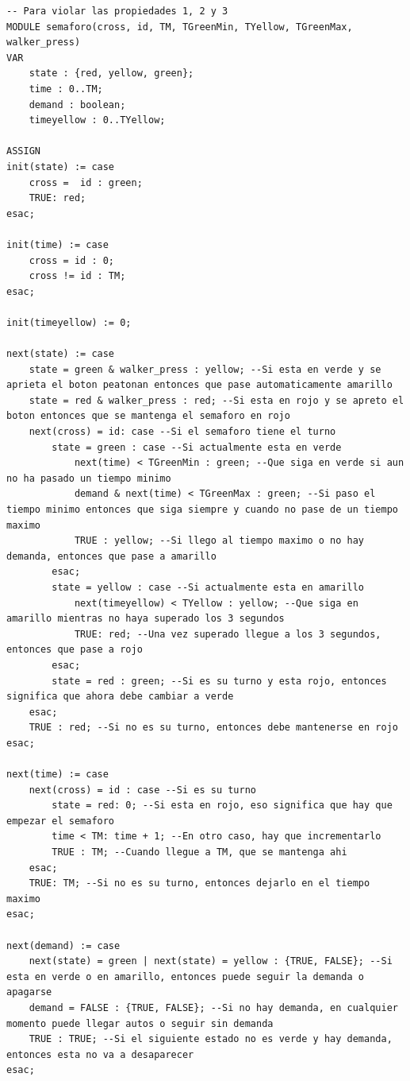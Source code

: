 \begin{lstlisting}[language=NuSMV, caption={Modelo con errores introducidos para violar specs 1, 2 y 3}]
-- Para violar las propiedades 1, 2 y 3
MODULE semaforo(cross, id, TM, TGreenMin, TYellow, TGreenMax, walker_press)
VAR
    state : {red, yellow, green};
    time : 0..TM;
    demand : boolean;
    timeyellow : 0..TYellow;

ASSIGN
init(state) := case
    cross =  id : green;
    TRUE: red;
esac;

init(time) := case
    cross = id : 0;
    cross != id : TM;
esac;

init(timeyellow) := 0;

next(state) := case
    state = green & walker_press : yellow; --Si esta en verde y se aprieta el boton peatonan entonces que pase automaticamente amarillo
    state = red & walker_press : red; --Si esta en rojo y se apreto el boton entonces que se mantenga el semaforo en rojo
    next(cross) = id: case --Si el semaforo tiene el turno
        state = green : case --Si actualmente esta en verde
            next(time) < TGreenMin : green; --Que siga en verde si aun no ha pasado un tiempo minimo
            demand & next(time) < TGreenMax : green; --Si paso el tiempo minimo entonces que siga siempre y cuando no pase de un tiempo maximo 
            TRUE : yellow; --Si llego al tiempo maximo o no hay demanda, entonces que pase a amarillo
        esac;
        state = yellow : case --Si actualmente esta en amarillo
            next(timeyellow) < TYellow : yellow; --Que siga en amarillo mientras no haya superado los 3 segundos
            TRUE: red; --Una vez superado llegue a los 3 segundos, entonces que pase a rojo
        esac;
        state = red : green; --Si es su turno y esta rojo, entonces significa que ahora debe cambiar a verde
    esac;
    TRUE : red; --Si no es su turno, entonces debe mantenerse en rojo
esac;

next(time) := case
    next(cross) = id : case --Si es su turno
        state = red: 0; --Si esta en rojo, eso significa que hay que empezar el semaforo
        time < TM: time + 1; --En otro caso, hay que incrementarlo
        TRUE : TM; --Cuando llegue a TM, que se mantenga ahi
    esac;
    TRUE: TM; --Si no es su turno, entonces dejarlo en el tiempo maximo
esac;

next(demand) := case 
    next(state) = green | next(state) = yellow : {TRUE, FALSE}; --Si esta en verde o en amarillo, entonces puede seguir la demanda o apagarse
    demand = FALSE : {TRUE, FALSE}; --Si no hay demanda, en cualquier momento puede llegar autos o seguir sin demanda
    TRUE : TRUE; --Si el siguiente estado no es verde y hay demanda, entonces esta no va a desaparecer
esac;


\end{lstlisting}
